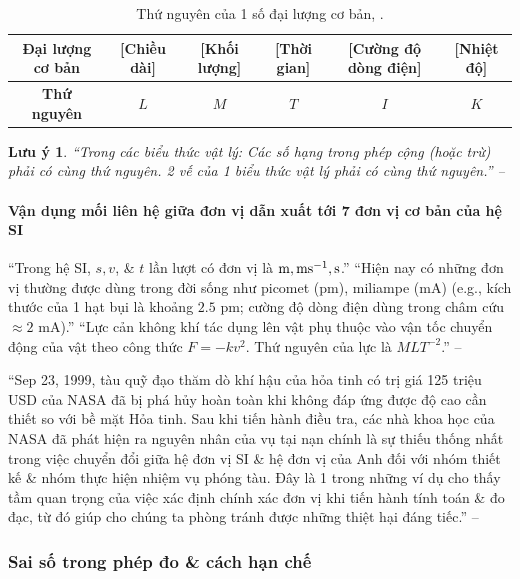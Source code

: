 \documentclass{article}
\numberwithin{equation}{section}
\newtheorem{luuy}{Lưu ý}[section]
\begin{document}
\begin{table}[H]
	\centering
	\begin{tabular}{|c|c|c|c|c|c|}
		\hline
		\textbf{Đại lượng cơ bản} & [Chiều dài] & [Khối lượng] & [Thời gian] & [Cường độ dòng điện] & [Nhiệt độ] \\
		\hline
		\textbf{Thứ nguyên} & $L$ & $M$ & $T$ & $I$ & $K$ \\
		\hline
	\end{tabular}
	\caption{Thứ nguyên của 1 số đại lượng cơ bản, \cite[Bảng 3.3, p. 16]{SGK_Vat_Ly_10_Chan_Troi_Sang_Tao}.}
	\label{tab:thu nguyen cua 1 so dai luong co ban}
\end{table}

\begin{luuy}
	``Trong các biểu thức vật lý: Các số hạng trong phép cộng (hoặc trừ) phải có cùng thứ nguyên. 2 vế của 1 biểu thức vật lý phải có cùng thứ nguyên.'' -- \cite[p. 17]{SGK_Vat_Ly_10_Chan_Troi_Sang_Tao}
\end{luuy}

\paragraph{Vận dụng mối liên hệ giữa đơn vị dẫn xuất tới 7 đơn vị cơ bản của hệ SI}
``Trong hệ SI, $s,v$, \& $t$ lần lượt có đơn vị là $\rm m,ms^{-1},s$.'' ``Hiện nay có những đơn vị thường được dùng trong đời sống như picomet (pm), miliampe (mA) (e.g., kích thước của 1 hạt bụi là khoảng $2.5$ pm; cường độ dòng điện dùng trong châm cứu $\approx2$ mA).'' ``Lực cản không khí tác dụng lên vật phụ thuộc vào vận tốc chuyển động của vật theo công thức $F = -kv^2$. Thứ nguyên của lực là $MLT^{-2}$.'' -- \cite[p. 17]{SGK_Vat_Ly_10_Chan_Troi_Sang_Tao}

``Sep 23, 1999, tàu quỹ đạo thăm dò khí hậu của hỏa tinh có trị giá 125 triệu USD của NASA đã bị phá hủy hoàn toàn khi không đáp ứng được độ cao cần thiết so với bề mặt Hỏa tinh. Sau khi tiến hành điều tra, các nhà khoa học của NASA đã phát hiện ra nguyên nhân của vụ tại nạn chính là sự thiếu thống nhất trong việc chuyển đổi giữa hệ đơn vị SI \& hệ đơn vị của Anh đối với nhóm thiết kế \& nhóm thực hiện nhiệm vụ phóng tàu. Đây là 1 trong những ví dụ cho thấy tầm quan trọng của việc xác định chính xác đơn vị khi tiến hành tính toán \& đo đạc, từ đó giúp cho chúng ta phòng tránh được những thiệt hại đáng tiếc.'' -- \cite[p. 18]{SGK_Vat_Ly_10_Chan_Troi_Sang_Tao}

\subsubsection{Sai số trong phép đo \& cách hạn chế}
\end{document}
